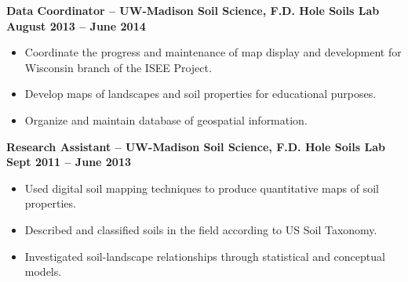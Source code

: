 \documentclass{article}
\begin{document}
\begin{small}
\begin{itemize}
	\end{itemize}
	\noindent \textbf{Data Coordinator -- UW-Madison Soil Science, F.D. Hole Soils Lab} \hfill \textbf{August 2013 -- June 2014}
	\begin{itemize}
		\item Coordinate the progress and maintenance of map display and development for Wisconsin branch of the ISEE Project.
		\item Develop maps of landscapes and soil properties for educational purposes.
		\item Organize and maintain database of geospatial information.
	\end{itemize}
	\noindent \textbf{Research Assistant -- UW-Madison Soil Science, F.D. Hole Soils Lab} \hfill \textbf{Sept 2011 -- June 2013}
	\begin{itemize}
		\item Used digital soil mapping techniques to produce quantitative maps of soil properties.
		\item Described and classified soils in the field according to US Soil Taxonomy.
		\item Investigated soil-landscape relationships through statistical and conceptual models.
	\end{itemize}

\end{small}
\end{document}
